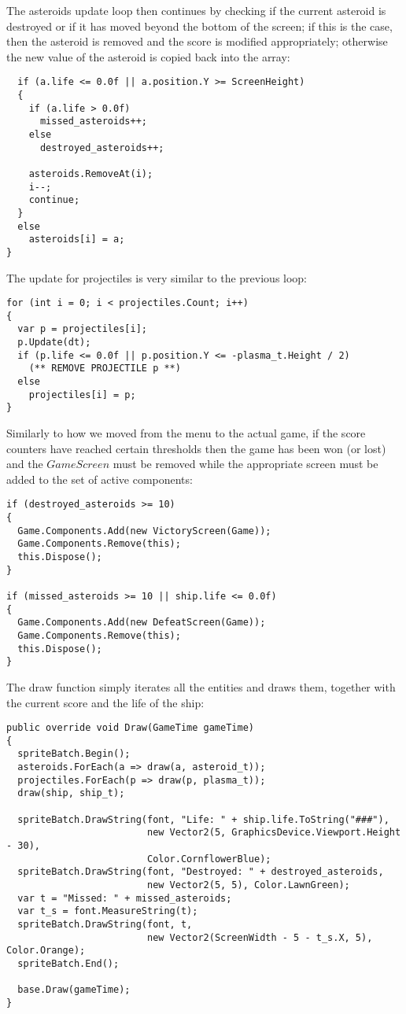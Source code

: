 The asteroids update loop then continues by checking if the current asteroid is destroyed or if it has moved beyond the bottom of the screen; if this is the case, then the asteroid is removed and the score is modified appropriately; otherwise the new value of the asteroid is copied back into the array:
\begin{lstlisting}
  if (a.life <= 0.0f || a.position.Y >= ScreenHeight)
  {
    if (a.life > 0.0f)
      missed_asteroids++;
    else
      destroyed_asteroids++;

    asteroids.RemoveAt(i);
    i--;
    continue;
  }
  else
    asteroids[i] = a;
}
\end{lstlisting}

The update for projectiles is very similar to the previous loop:
\begin{lstlisting}
for (int i = 0; i < projectiles.Count; i++)
{
  var p = projectiles[i];
  p.Update(dt);
  if (p.life <= 0.0f || p.position.Y <= -plasma_t.Height / 2)
    (** REMOVE PROJECTILE p **)
  else
    projectiles[i] = p;
}
\end{lstlisting}

Similarly to how we moved from the menu to the actual game, if the score counters have reached certain thresholds then the game has been won (or lost) and the $GameScreen$ must be removed while the appropriate screen must be added to the set of active components:
\begin{lstlisting}
if (destroyed_asteroids >= 10)
{
  Game.Components.Add(new VictoryScreen(Game));
  Game.Components.Remove(this);
  this.Dispose();
}

if (missed_asteroids >= 10 || ship.life <= 0.0f)
{
  Game.Components.Add(new DefeatScreen(Game));
  Game.Components.Remove(this);
  this.Dispose();
}\end{lstlisting}

The draw function simply iterates all the entities and draws them, together with the current score and the life of the ship:
\begin{lstlisting}
public override void Draw(GameTime gameTime)
{
  spriteBatch.Begin();
  asteroids.ForEach(a => draw(a, asteroid_t));
  projectiles.ForEach(p => draw(p, plasma_t));
  draw(ship, ship_t);

  spriteBatch.DrawString(font, "Life: " + ship.life.ToString("###"), 
                         new Vector2(5, GraphicsDevice.Viewport.Height - 30), 
                         Color.CornflowerBlue);
  spriteBatch.DrawString(font, "Destroyed: " + destroyed_asteroids, 
                         new Vector2(5, 5), Color.LawnGreen);
  var t = "Missed: " + missed_asteroids;
  var t_s = font.MeasureString(t);
  spriteBatch.DrawString(font, t, 
                         new Vector2(ScreenWidth - 5 - t_s.X, 5), Color.Orange);
  spriteBatch.End();

  base.Draw(gameTime);
}
\end{lstlisting}

